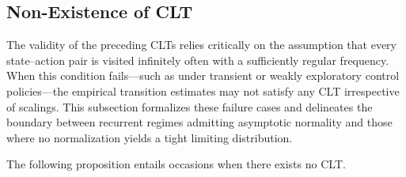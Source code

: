 \documentclass[twoside,11pt]{article}
\newcommand{\pow}[1]{^{(#1)}}%
\numberwithin{equation}{section}
\newcommand{\lc}{\left\{}
\newcommand{\rc}{\right\}}
\newcommand{\Pbb}{\mathbb{P}}
\newcommand{\prob}{\Pbb}
\begin{document}
\subsection{Non-Existence of CLT}
The validity of the preceding CLTs relies critically on the assumption that every state–action pair is visited infinitely often with a sufficiently regular frequency. 
When this condition fails—such as under transient or weakly exploratory control policies—the empirical transition estimates may not satisfy any CLT irrespective of scalings. 
This subsection formalizes these failure cases and delineates the boundary between recurrent regimes admitting asymptotic normality and those where no normalization yields a tight limiting distribution.

The following proposition entails occasions when there exists no CLT.

\end{document}
